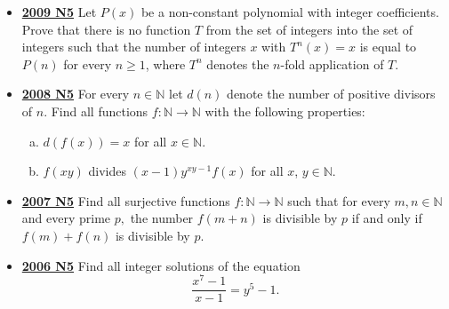 \documentclass[11pt]{scrartcl}
\begin{document}
\begin{itemize}[leftmargin=*]
\item \href{https://artofproblemsolving.com/community/c6h355799p1932945}{\textbf{2009 N5}} Let $P(x)$ be a non-constant polynomial with integer coefficients. Prove that there is no function $T$ from the set of integers into the set of integers such that the number of integers $x$ with $T^n(x)=x$ is equal to $P(n)$ for every $n\geqslant  1$, where $T^n$ denotes the $n$-fold application of $T$.

\item \href{https://artofproblemsolving.com/community/c6h287873p1555934}{\textbf{2008 N5}} For every $ n\in\mathbb{N}$ let $ d(n)$ denote the number of positive divisors of $ n$. Find all functions $ f: \mathbb{N}\to\mathbb{N}$ with the following properties: 
\begin{enumerate}[(a)]
\item $d\left(f(x)\right) = x$ for all $ x\in\mathbb{N}$.
\item $ f(xy)$ divides $ (x - 1)y^{xy - 1}f(x)$ for all $ x$, $ y\in\mathbb{N}$.
\end{enumerate}

\item \href{https://artofproblemsolving.com/community/c6h214717p1187222}{\textbf{2007 N5}} Find all surjective functions $ f: \mathbb{N} \to \mathbb{N}$ such that for every $ m,n \in \mathbb{N}$ and every prime $ p,$ the number $ f(m + n)$ is divisible by $ p$ if and only if $ f(m) + f(n)$ is divisible by $ p$.
\item \href{https://artofproblemsolving.com/community/c6h138053p780855}{\textbf{2006 N5}} 	Find all integer solutions of the equation\[\frac {x^{7} - 1}{x - 1} = y^{5} - 1.\]
\end{itemize}


\newpage
\end{document}
